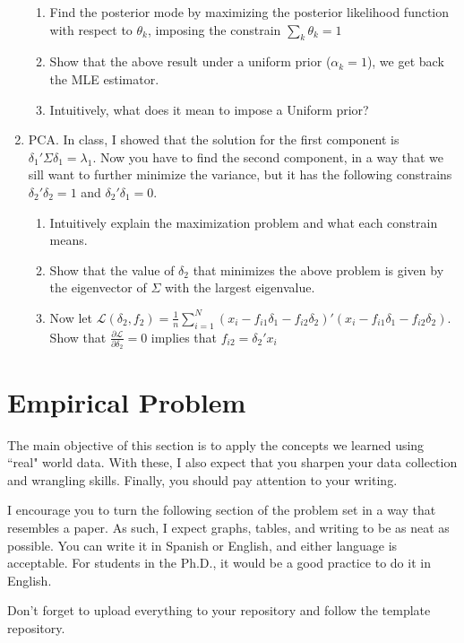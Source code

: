 \documentclass[12pt,onecolumn]{article}
\begin{document}
\begin{enumerate}
\begin{enumerate}
  \item Find the posterior mode by maximizing the posterior likelihood function with respect to $\theta_k$, imposing the constrain  $\sum_k\theta_k=1$
  \item Show that the above result under a uniform prior ($\alpha_k=1$), we get back the MLE estimator. 
  \item Intuitively, what does it mean to impose a Uniform prior?
\end{enumerate}
\item PCA. In class, I showed that the solution for the first component is $\delta_1'\Sigma\delta_1=\lambda_1$. Now you have to find the second component, in a way that we sill want to further minimize the variance, but it has the following constrains $\delta_2'\delta_2=1$ and $\delta_2'\delta_1=0$.
\begin{enumerate}
  \item Intuitively explain the maximization problem and what each constrain means.
  \item Show that the value of $\delta_2$ that minimizes the above problem is given by the eigenvector of $\Sigma$ with the largest eigenvalue.
  \item Now let $\mathcal{L}(\delta_2,f_2)=\frac{1}{n}\sum_{i=1}^N(x_i-f_{i1}\delta_1-f_{i2}\delta_2)'(x_i-f_{i1}\delta_1-f_{i2}\delta_2)$. Show that $\frac{\partial \mathcal{L}}{ \partial \delta_2} =0$ implies that $f_{i2}=\delta_2'x_i$

\end{enumerate}
\end{enumerate}


\section{Empirical Problem}



The main objective of this section is to apply the concepts we learned using ``real" world data. With these, I also expect that you sharpen your data collection and wrangling skills. Finally, you should pay attention to your writing.

I encourage you to turn the following section of the problem set in a way that resembles a paper. As such, I expect graphs, tables, and writing to be as neat as possible. You can write it in Spanish or English, and either language is acceptable. For students in the Ph.D., it would be a good practice to do it in English.

Don't forget to upload everything to your repository and follow the template repository. 
\end{document}
